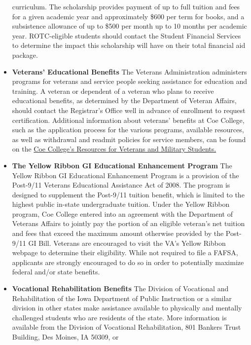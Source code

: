 \documentclass[
  letterpaper,
]{scrbook}
\begin{document}
\begin{itemize}
  curriculum. The scholarship provides payment of up to full tuition and
  fees for a given academic year and approximately \$600 per term for
  books, and a subsistence allowance of up to \$500 per month up to 10
  months per academic year. ROTC-eligible students should contact the
  Student Financial Services to determine the impact this scholarship
  will have on their total financial aid package.
\item
  \textbf{Veterans' Educational Benefits} The Veterans Administration
  administers programs for veterans and service people seeking
  assistance for education and training. A veteran or dependent of a
  veteran who plans to receive educational benefits, as determined by
  the Department of Veteran Affairs, should contact the Registrar's
  Office well in advance of enrollment to request certification.
  Additional information about veterans' benefits at Coe College, such
  as the application process for the various programs, available
  resources, as well as withdrawal and readmit policies for service
  members, can be found on the
  \href{https://www.coe.edu/admission/financial-aid-scholarships/resources/veterans-and-military-benefits}{Coe
  College's Resources for Veterans and Military Students.}
\item
  \textbf{The Yellow Ribbon GI Educational Enhancement Program} The
  Yellow Ribbon GI Educational Enhancement Program is a provision of the
  Post-9/11 Veterans Educational Assistance Act of 2008. The program is
  designed to supplement the Post-9/11 tuition benefit, which is limited
  to the highest public in-state undergraduate tuition. Under the Yellow
  Ribbon program, Coe College entered into an agreement with the
  Department of Veterans Affairs to jointly pay the portion of an
  eligible veteran's net tuition and fees that exceed the maximum amount
  otherwise provided by the Post-9/11 GI Bill. Veterans are encouraged
  to visit the VA's Yellow Ribbon webpage to determine their
  eligibility. While not required to file a FAFSA, applicants are
  strongly encouraged to do so in order to potentially maximize federal
  and/or state benefits.
\item
  \textbf{Vocational Rehabilitation Benefits} The Division of Vocational
  and Rehabilitation of the Iowa Department of Public Instruction or a
  similar division in other states make assistance available to
  physically and mentally challenged students who are residents of the
  state. More information is available from the Division of Vocational
  Rehabilitation, 801 Bankers Trust Building, Des Moines, IA 50309, or

\end{itemize}
\end{document}
